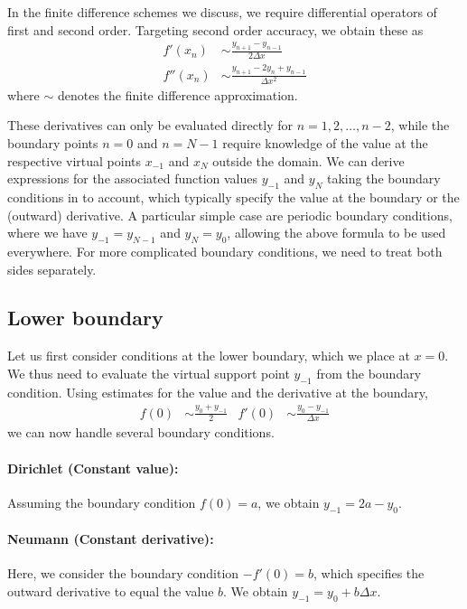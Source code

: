 \documentclass[
	superscriptaddress,
	twocolumn,
	aps, prl
]{revtex4-1}
\newcommand{\dx}{\Delta x}
\begin{document}
In the finite difference schemes we discuss, we require differential operators of first and second order.
Targeting second order accuracy, we obtain these as 
\begin{subequations}
\begin{align}
	f'(x_n) &\sim \frac{y_{n+1} - y_{n-1}}{2\dx}
\\	
	f''(x_n) &\sim \frac{y_{n+1} - 2 y_n + y_{n-1}}{\dx^2}
\end{align}
\end{subequations}
where $\sim$ denotes the finite difference approximation.

These derivatives can only be evaluated directly for $n=1,2,\ldots, n-2$, while the boundary points $n=0$ and $n=N-1$ require knowledge of the value at the respective virtual points $x_{-1}$ and $x_N$ outside the domain.
We can derive expressions for the associated function values $y_{-1}$ and $y_N$  taking the boundary conditions in to account, which typically specify the value at the boundary or the (outward) derivative.
A particular simple case are periodic boundary conditions, where we have $y_{-1} = y_{N-1}$ and $y_N = y_0$, allowing the above formula to be used everywhere.
For more complicated boundary conditions, we need to treat both sides separately.

\subsection{Lower boundary}
Let us first consider conditions at the lower boundary, which we place at $x=0$.
We thus need to evaluate the virtual support point $y_{-1}$ from the boundary condition.
Using estimates for the value and the derivative at the boundary,
\begin{align}
	f(0) &\sim \frac{y_0 + y_{-1}}{2}
&
	f'(0) &\sim \frac{y_0 - y_{-1}}{\dx}
\end{align}
we can now handle several boundary conditions.

\paragraph{Dirichlet (Constant value):}
Assuming the boundary condition $f(0) = a$, we obtain $y_{-1} = 2a - y_0$.

\paragraph{Neumann (Constant derivative):}
Here, we consider the boundary condition $-f'(0) = b$, which specifies the outward derivative to equal the value $b$.
We obtain $y_{-1} = y_0 + b \dx$.
\end{document}
